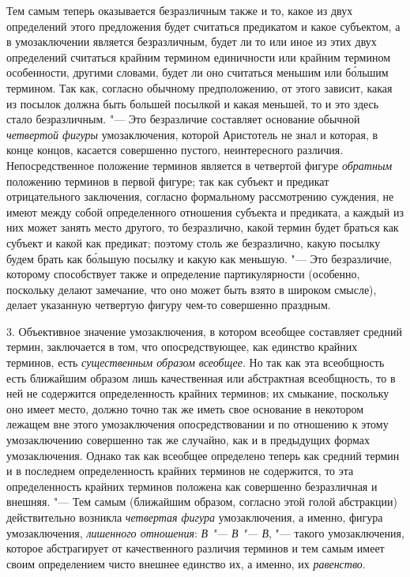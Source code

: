 Тем самым теперь оказывается безразличным также и то, какое из
двух определений этого предложения будет считаться предикатом и какое
субъектом, а в умозаключении является безразличным, будет ли то или иное из
этих двух определений считаться крайним термином единичности или крайним
термином особенности, другими словами, будет ли оно считаться меньшим или
б\'{о}льшим термином. Так как, согласно обычному предположению, от этого
зависит, какая из посылок должна быть большей посылкой и какая меньшей, то
и это здесь стало безразличным. "--- Это безразличие составляет
основание обычной {\em четвертой фигуры} умозаключения,
которой Аристотель не знал и которая,
в конце концов, касается совершенно пустого, неинтересного различия.
Непосредственное положение терминов является в четвертой фигуре
{\em обратным} положению
терминов в первой фигуре; так как субъект и предикат отрицательного
заключения, согласно формальному рассмотрению суждения, не имеют между
собой определенного отношения субъекта и предиката, а каждый из них может
занять место другого, то безразлично, какой термин будет браться как
субъект и какой как предикат; поэтому столь же безразлично, какую посылку
будем брать как б\'{о}льшую посылку и какую как меньшую. "---
Это безразличие, которому способствует также и определение
партикулярности (особенно, поскольку делают замечание, что оно может быть
взято в широком смысле), делает указанную четвертую фигуру чем-то
совершенно праздным.

3. Объективное значение умозаключения, в котором всеобщее
составляет средний термин, заключается в том, что опосредствующее, как
единство крайних терминов, есть
{\em существенным образом всеобщее}.
Но так как эта всеобщность есть ближайшим образом лишь
качественная или абстрактная всеобщность, то в ней не содержится
определенность крайних терминов; их смыкание, поскольку оно имеет место,
должно точно так же иметь свое основание в некотором лежащем вне этого
умозаключения опосредствовании и по отношению к этому умозаключению
совершенно так же случайно, как и в предыдущих формах умозаключения. Однако
так как всеобщее определено теперь как средний термин и в последнем
определенность крайних терминов не содержится, то эта определенность
крайних терминов положена как совершенно безразличная и внешняя. "---
Тем самым (ближайшим образом, согласно этой голой
абстракции) действительно возникла
{\em четвертая фигура}
умозаключения, а именно, фигура умозаключения,
{\em лишенного отношения}:
{\em В "--- В
"--- В}, "--- такого умозаключения, которое
абстрагирует от качественного различия терминов и тем самым имеет своим
определением чисто внешнее единство их, а именно, их
{\em равенство}.

